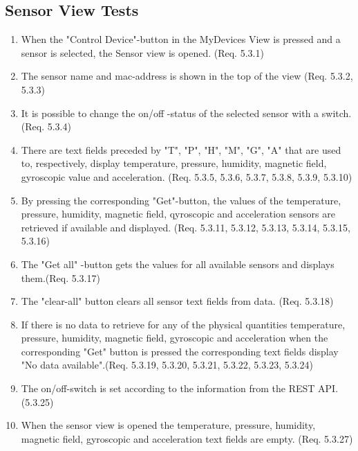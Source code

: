 \documentclass[a4paper]{article}
\newlength{\testlabellength}
\newenvironment{testlist}{\begin{enumerate}[label=\bfseries Test \thesubsection.\arabic* , labelindent=0pt, labelwidth=\testlabellength , leftmargin=2cm]}{\end{enumerate}}
\begin{document}
\begin{appendices}
\subsection{Sensor View Tests}
\begin{testlist}
\item When the "Control Device"-button in the MyDevices View is pressed and a sensor is selected, the Sensor view is opened. (Req. 5.3.1)

\item The sensor name and mac-address is shown in the top of the view (Req. 5.3.2, 5.3.3)
 
\item It is possible to change the on/off -status of the selected sensor with a switch. (Req. 5.3.4)

\item There are text fields preceded by "T", "P", "H", "M", "G", "A" that are used to, respectively, display temperature, pressure, humidity, magnetic field, gyroscopic value and acceleration. (Req. 5.3.5, 5.3.6, 5.3.7, 5.3.8, 5.3.9, 5.3.10)

\item By pressing the corresponding "Get"-button, the values of the temperature, pressure, humidity, magnetic field, qyroscopic and acceleration sensors are retrieved if available and displayed. (Req. 5.3.11, 5.3.12, 5.3.13, 5.3.14, 5.3.15, 5.3.16)

\item The "Get all" -button gets the values for all available sensors and displays them.(Req. 5.3.17)
\item The "clear-all" button clears all sensor text fields from data. (Req. 5.3.18)
\item If there is no data to retrieve for any of the physical quantities temperature, pressure, humidity, magnetic field, gyroscopic and acceleration when the corresponding "Get" button is pressed the corresponding text fields display "No data available".(Req. 5.3.19, 5.3.20, 5.3.21, 5.3.22, 5.3.23, 5.3.24)

\item The on/off-switch is set according to the information from the REST API. (5.3.25)

\item When the sensor view is opened the temperature, pressure, humidity, magnetic field, gyroscopic and acceleration text fields are empty. (Req. 5.3.27)

\end{testlist}


\end{appendices}
\end{document}
